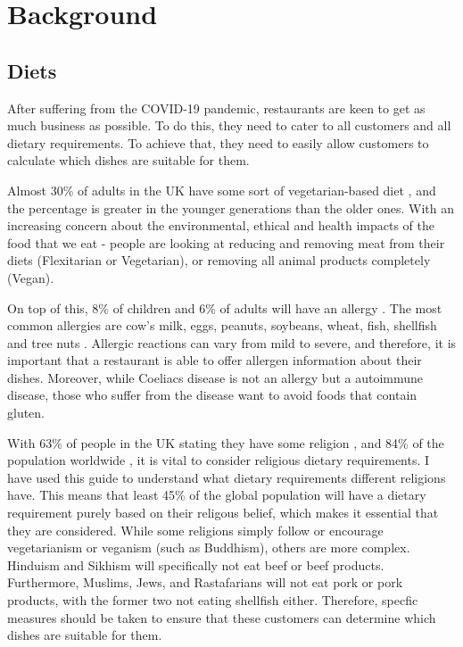 \chapter{Background}

\section{Diets}

After suffering from the COVID-19 pandemic, restaurants are keen to get as much business as possible. To do this, they need to cater to all customers and all dietary requirements. To achieve that, they need to easily allow customers to calculate which dishes are suitable for them.

Almost 30\% of adults in the UK have some sort of vegetarian-based diet \cite{vege_2022}, and the percentage is greater in the younger generations than the older ones. With an increasing concern about the environmental, ethical and health impacts of the food that we eat - people are looking at reducing and removing meat from their diets (Flexitarian or Vegetarian), or removing all animal products completely (Vegan).

On top of this, 8\% of children and 6\% of adults will have an allergy \cite{sicherer_sampson_2017}. The most common allergies are cow's milk, eggs, peanuts, soybeans, wheat, fish, shellfish and tree nuts \cite{allergies_west_2023}. Allergic reactions can vary from mild to severe, and therefore, it is important that a restaurant is able to offer allergen information about their dishes. Moreover, while Coeliacs disease is not an allergy but a autoimmune disease, those who suffer from the disease want to avoid foods that contain gluten.

With 63\% of people in the UK stating they have some religion \cite{religion_ons_census_2021}, and 84\% of the population worldwide \cite{hackett_grim_2012}, it is vital to consider religious dietary requirements. I have used this guide \cite{guidance_on_foods_for_religious_faiths_2009} to understand what dietary requirements different religions have. This means that least 45\% of the global population will have a dietary requirement purely based on their religous belief, which makes it essential that they are considered. While some religions simply follow or encourage vegetarianism or veganism (such as Buddhism), others are more complex. Hinduism and Sikhism will specifically not eat beef or beef products. Furthermore, Muslims, Jews, and Rastafarians will not eat pork or pork products, with the former two not eating shellfish either. Therefore, specfic measures should be taken to ensure that these customers can determine which dishes are suitable for them.

